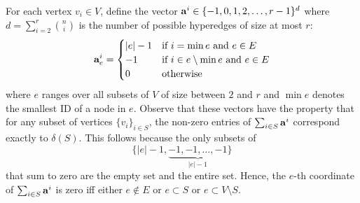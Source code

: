 
For each vertex $v_i\in V$, define the vector $\mathbf{a}^i\in \{-1,0,1,2, \ldots, r-1\}^d$ where $d=\sum_{i=2}^r {n\choose i}$ is the number of possible hyperedges of size at most $r$:
 \[
  \mathbf{a}^i_{e}=
\begin{cases}
   |e|-1     & \mbox{if } i=\min e \mbox{ and } e \in E \\
   -1     & \mbox{if } i\in e\setminus \min e  \mbox{ and }  e \in E \\
   0      & \mbox{otherwise}
\end{cases}
 \]
 where $e$ ranges over all subsets of $V$ of size between $2$ and $r$ and $\min e$ denotes the smallest ID of a node in $e$.
Observe that these vectors have the property that
for any subset of vertices $\{v_i\}_{i\in S}$, the non-zero entries of $\sum_{i\in S} \mathbf{a}^i$ correspond exactly to $\delta(S)$. This follows because the only subsets of 
\[\{|e|-1, \underbrace{-1, -1, \ldots, -1}_{|e|-1}\}\]
that sum to zero are the empty set and the entire set. Hence, the $e$-th coordinate of $\sum_{i\in S} \mathbf{a}^i$ is zero iff either $e\not \in E$ or $e\subset S$ or $e\subset V\setminus S$.

